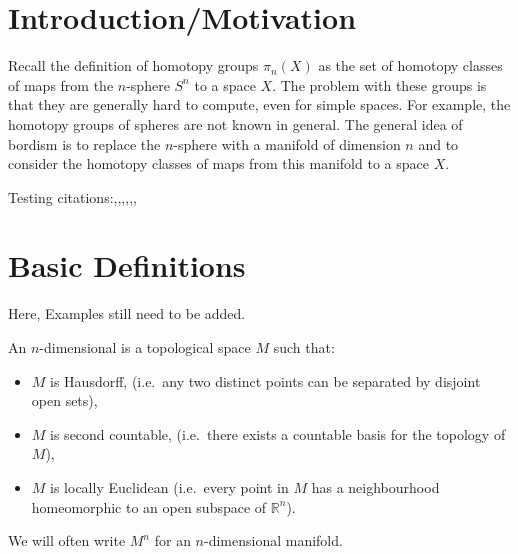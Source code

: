 \documentclass[a4paper,11pt]{article}
\begin{document}
\maketitle
{}
\tableofcontents\newpage

\begin{comment}
\newgeometry{
	left=20mm, %
    top=25mm,
    right=20mm, %
  bmargin=2cm %
}
\end{comment}

\setcounter{section}{-1}

\section{Introduction/Motivation}

Recall the definition of homotopy groups \(\pi_n(X)\) as the set of homotopy classes of maps from the \(n\)-sphere \(S^n\) to a space \(X\). 
The problem with these groups is that they are generally hard to compute, even for simple spaces. 
For example, the homotopy groups of spheres are not known in general.
The general idea of bordism is to replace the \(n\)-sphere with a manifold of dimension \(n\) and to consider the homotopy classes of maps from this manifold to a space \(X\).

Testing citations:\cite{atiyah},\cite{brocker},\cite{thom},\cite{lee},\cite{hatcher},\cite{dieck},\cite{luck}

\section{Basic Definitions}
Here, Examples still need to be added.

\begin{definition}
    An \(n\)-dimensional  is a topological space \(M\) such that:
    \begin{itemize}
        \item \(M\) is Hausdorff, (i.e.\ any two distinct points can be separated by disjoint open sets),
        \item \(M\) is second countable, (i.e.\ there exists a countable basis for the topology of \(M\)),
        \item \(M\) is locally Euclidean (i.e.\ every point in \(M\) has a neighbourhood homeomorphic to an open subspace of \(\mathbb{R}^n\)).
    \end{itemize}
    We will often write \(M^n\) for an \(n\)-dimensional manifold.
\end{definition}
\end{document}
